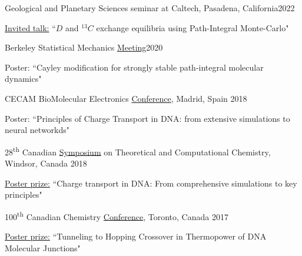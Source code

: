 \documentclass[margin,line]{res}
\newenvironment{list1}{
  \begin{list}{\ding{113}}{%
      \setlength{\itemsep}{0in}
      \setlength{\parsep}{0in} \setlength{\parskip}{0in}
      \setlength{\topsep}{0in} \setlength{\partopsep}{0in} 
      \setlength{\leftmargin}{0.17in}}}{\end{list}}
\begin{document}
\begin{resume}
\vspace*{-1mm}

Geological and Planetary Sciences seminar at Caltech, Pasadena, California\hfill{2022}

\begin{list1}
\item[]\underline{Invited talk:} ``$D$ and $^{13}C$ exchange equilibria using Path-Integral Monte-Carlo"
\end{list1}

\vspace*{-1mm}

Berkeley Statistical Mechanics  \href{http://berkeleystatmech.org/}{Meeting}\hfill{2020}

\begin{list1}
\item[]Poster: ``Cayley modification for strongly stable path-integral molecular dynamics"
\end{list1}

\vspace*{-1mm}

CECAM BioMolecular Electronics \href{https://www.cecam.org/workshop-details/cecampsi-k-research-conference-biomolecular-electronics-biomolectro-246}{Conference}, Madrid, Spain \hfill {2018}

\begin{list1}
\item[]Poster: ``Principles of Charge Transport in DNA: from extensive simulations to neural networkds"
\end{list1}

\vspace*{-1mm}

28\textsuperscript{th} Canadian \href{http://catc.ca/cstcc2018}{Symposium} on Theoretical and Computational Chemistry, Windsor, Canada \hfill {2018}

\begin{list1}
\item[]\underline{Poster prize:} ``Charge transport in DNA: From comprehensive simulations to key principles"
\end{list1}

\vspace*{-1mm}

100\textsuperscript{th} Canadian Chemistry \href{https://www.cheminst.ca/magazine/article/csc-celebrates-100-years-of-chemistry-in-toronto/}{Conference}, Toronto, Canada \hfill {2017}

\begin{list1}
\item[]\underline{Poster prize:} ``Tunneling to Hopping Crossover in Thermopower of DNA Molecular Junctions" 
\end{list1}


\end{resume}
\end{document}
